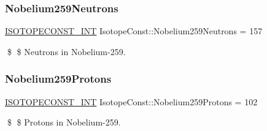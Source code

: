 \subsubsection{\texorpdfstring{Nobelium259\+Neutrons}{Nobelium259Neutrons}}
{\footnotesize\ttfamily \mbox{\hyperlink{group___isotope_const-_macros_ga5f18360b3e99483a35c32d789e62621c}{I\+S\+O\+T\+O\+P\+E\+C\+O\+N\+S\+T\+\_\+\+I\+NT}} Isotope\+Const\+::\+Nobelium259\+Neutrons = 157}

\$ \$ Neutrons in Nobelium-\/259. \mbox{\label{group___isotope_const-_nobelium-_no259_gad354d008215e0b21152b7bcb53fccb37}} 
\subsubsection{\texorpdfstring{Nobelium259\+Protons}{Nobelium259Protons}}
{\footnotesize\ttfamily \mbox{\hyperlink{group___isotope_const-_macros_ga5f18360b3e99483a35c32d789e62621c}{I\+S\+O\+T\+O\+P\+E\+C\+O\+N\+S\+T\+\_\+\+I\+NT}} Isotope\+Const\+::\+Nobelium259\+Protons = 102}

\$ \$ Protons in Nobelium-\/259. 